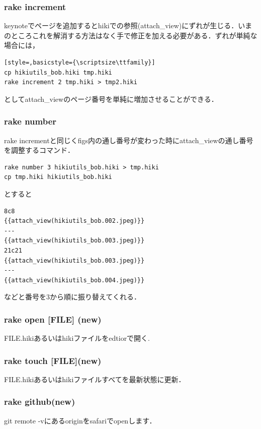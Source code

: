 \subsubsection{rake increment}
keynoteでページを追加するとhikiでの参照(attach\_view)にずれが生じる．いまのところこれを解消する方法はなく手で修正を加える必要がある．ずれが単純な場合には，
\begin{lstlisting}[style=,basicstyle={\scriptsize\ttfamily}]
cp hikiutils_bob.hiki tmp.hiki
rake increment 2 tmp.hiki > tmp2.hiki
\end{lstlisting}
としてattach\_viewのページ番号を単純に増加させることができる．

\subsubsection{rake number}
rake incrementと同じくfigs内の通し番号が変わった時にattach\_viewの通し番号を調整するコマンド．
\begin{lstlisting}[style=customCsh,basicstyle={\scriptsize\ttfamily}]
rake number 3 hikiutils_bob.hiki > tmp.hiki
cp tmp.hiki hikiutils_bob.hiki
\end{lstlisting}
とすると
\begin{lstlisting}[style=customCsh,basicstyle={\scriptsize\ttfamily}]
8c8
{{attach_view(hikiutils_bob.002.jpeg)}}
---
{{attach_view(hikiutils_bob.003.jpeg)}}
21c21
{{attach_view(hikiutils_bob.003.jpeg)}}
---
{{attach_view(hikiutils_bob.004.jpeg)}}
\end{lstlisting}
などと番号を3から順に振り替えてくれる．

\subsubsection{rake open [FILE] (new)}
FILE.hikiあるいはhikiファイルをedtiorで開く.

\subsubsection{rake touch [FILE](new)}
FILE.hikiあるいはhikiファイルすべてを最新状態に更新．

\subsubsection{rake github(new)}
git remote -vにあるoriginをsafariでopenします．

